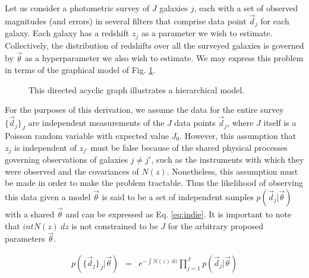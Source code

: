 \documentclass[12pt, onecolumn]{emulateapj}
\begin{document}
Let us consider a photometric survey of $J$ galaxies $j$, each with a set of observed magnitudes (and errors) in several filters that comprise data point $\vec{d}_{j}$ for each galaxy.  Each galaxy has a redshift $z_{j}$ as a parameter we wish to estimate.  Collectively, the distribution of redshifts over all the surveyed galaxies is governed by $\vec{\theta}$ as a hyperparameter we also wish to estimate.  We may express this problem in terms of the graphical model of Fig. \ref{fig:flow}.

\begin{figure}
\label{fig:flow}
\vspace{0.5cm}
\begin{center}
\caption{This directed acyclic graph illustrates a hierarchical model.}
\end{center}
\end{figure}

For the purposes of this derivation, we assume the data for the entire survey $\{\vec{d}_{j}\}_{J}$ are independent measurements of the $J$ data points $\vec{d}_{j}$, where $J$ itself is a Poisson random variable with expected value $J_{0}$.  However, this assumption that $z_{j}$ is independent of $z_{j'}$ must be false because of the shared physical processes governing observations of galaxies $j\neq j'$, such as the instruments with which they were observed and the covariances of $N(z)$.  Nonetheless, this assumption must be made in order to make the problem tractable.  Thus the likelihood of observing this data given a model $\vec{\theta}$ is said to be a set of independent samples $p(\vec{d}_{j}|\vec{\theta})$ with a shared $\vec{\theta}$ and can be expressed as Eq. \ref{eq:indie}.  \citep{for14}  It is important to note that $int N(z)\ dz$ is not constrained to be $J$ for the arbitrary proposed parameters $\vec{\theta}$.

\begin{eqnarray}
\label{eq:indie}
p(\{\vec{d}_{j}\}_{J}|\vec{\theta}) &=& e^{-\int N(z)\ dz}\prod_{j=1}^{J}p(\vec{d}_{j}|\vec{\theta})
\end{eqnarray}
\end{document}
